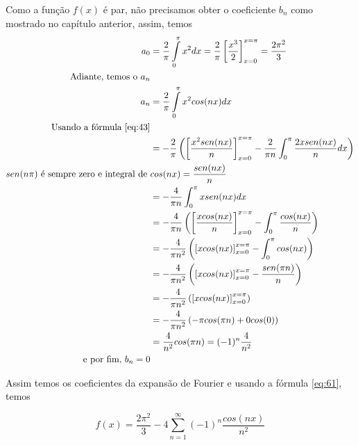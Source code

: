 Como a função $f(x)$ é par, não precisamos obter o coeficiente $b_n$ como mostrado 
no capítulo anterior, assim, temos
\begin{equation}
\notag
\label{eq:exemplo1}
    \begin{split}
        a_0 &= \dfrac{2}{\pi} \int\limits_{0}^{\pi}x^2 dx = \dfrac{2}{\pi}\left[\dfrac{x^3}{2}\right]_{x=0}^{x=\pi} = \dfrac{2\pi^2}{3}\\
        \text{Adiante, temos o }a_n &\\
        a_n &= \dfrac{2}{\pi} \int\limits_{0}^{\pi}x^2 cos(nx) dx\\
        \text{Usando a fórmula \ref{eq:43}}&\\
        &= -\dfrac{2}{\pi}\left( \left[\dfrac{x^2sen(nx)}{n}\right]_{x=0}^{x=\pi} - \dfrac{2}{\pi n}\int_{0}^{\pi}\dfrac{2x sen(nx)}{n}dx \right)\\
        sen(n\pi)\text{ é sempre zero e integral de }& cos(nx) = \dfrac{sen(nx)}{n}\\
        &= -\dfrac{4}{\pi n}\int_{0}^{\pi}x sen(nx)dx \\
        &= -\dfrac{4}{\pi n} \left(\left[\dfrac{x cos(nx)}{n}\right]_{x=0}^{x=\pi} - \int_{0}^{\pi}\dfrac{cos(nx)}{n} \right)\\
        &= -\dfrac{4}{\pi n^2} \left(\left[x cos(nx)\right]_{x=0}^{x=\pi} - \int_{0}^{\pi}cos(nx)\right)\\
        &= -\dfrac{4}{\pi n^2} \left(\left[x cos(nx)\right]_{x=0}^{x=\pi} - \dfrac{sen(\pi n)}{n}\right)\\
        &= -\dfrac{4}{\pi n^2} \left(\left[x cos(nx)\right]_{x=0}^{x=\pi}\right)\\
        &= -\dfrac{4}{\pi n^2} \left( - \pi cos(\pi n) + 0 cos(0) \right)\\
        &= \dfrac{4}{n^2}cos(\pi n) = (-1)^n \dfrac{4}{n^2}\\
        \text{e por fim, }b_n = 0 &
    \end{split}
\end{equation}

Assim temos os coeficientes da expansão de Fourier e usando a fórmula \ref{eq:61}, temos

\begin{equation}
    \label{eq:exemplo1SF}
    f(x) = \dfrac{2\pi^2}{3} - 4\sum\limits_{n=1}^{\infty}(-1)^n \dfrac{cos(nx)}{n^2}
\end{equation}